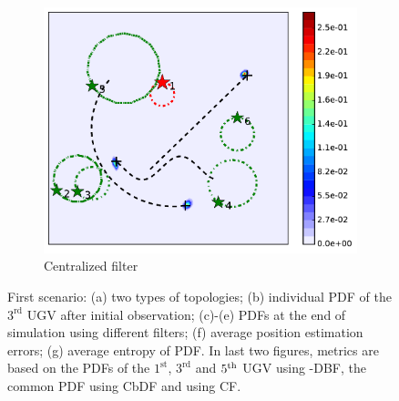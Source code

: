 \begin{figure}
\begin{subfigure}[b]{0.23\textwidth}
			\includegraphics[width=\textwidth]{figures/hetero_mov_sen_mov_tar_rbt1_step40}
			\caption{Centralized filter}\label{fig:sta_sen_sta_tar_top1_cent}
		\end{subfigure}	
		\caption{First scenario: (a) two types of topologies; (b) individual PDF of the $3^\text{rd}$ UGV after initial observation; (c)-(e) PDFs at the end of simulation using different filters; (f) average position estimation errors; (g) average entropy of PDF. In last two figures, metrics are based on the PDFs of the $1^\text{st}$, $3^\text{rd}$ and $5^\text{th}$ UGV using \proto-DBF, the common PDF using CbDF and using CF.}
		\label{fig:mov_sen_mov_tar1}
	\end{figure}
	
